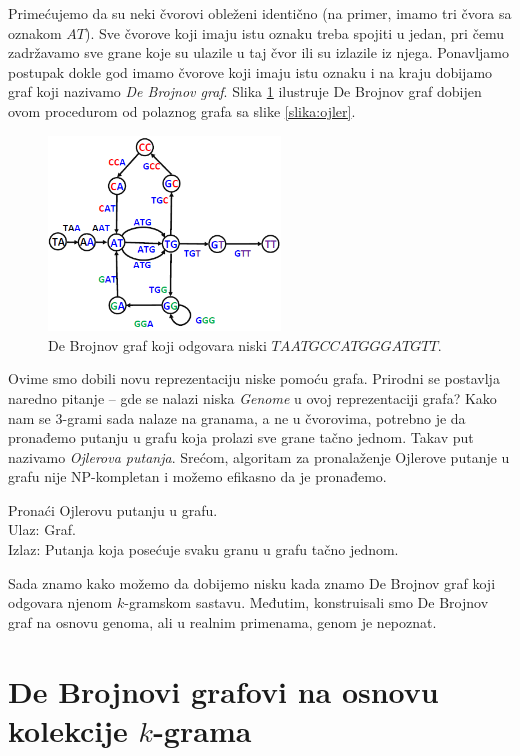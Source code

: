 Primećujemo da su neki čvorovi obleženi identično (na primer, imamo tri čvora sa oznakom $AT$). Sve čvorove koji imaju istu oznaku treba spojiti u jedan, pri čemu zadržavamo sve grane koje su ulazile u taj čvor ili su izlazile iz njega. Ponavljamo postupak dokle god imamo čvorove koji imaju istu oznaku i na kraju dobijamo graf koji nazivamo \emph{De Brojnov graf}. Slika \ref{slika:debrojnov} ilustruje De Brojnov graf dobijen ovom procedurom od polaznog grafa sa slike \ref{slika:ojler}. 

\begin{figure}[h]
	\centering
	\includegraphics[width=0.55\textwidth]{poglavlja/3/slike/debrojnov.png}
	\caption{De Brojnov graf koji odgovara niski $TAATGCCATGGGATGTT$.}
	\label{slika:debrojnov}
\end{figure} 

Ovime smo dobili novu reprezentaciju niske pomoću grafa. Prirodni se postavlja naredno pitanje -- gde se nalazi niska \textit{Genome} u ovoj reprezentaciji grafa? Kako nam se 3-grami sada nalaze na granama, a ne u čvorovima, potrebno je da pronađemo putanju u grafu koja prolazi sve grane tačno jednom. Takav put nazivamo \emph{Ojlerova putanja}. Srećom, algoritam za pronalaženje Ojlerove putanje u grafu nije NP-kompletan i možemo efikasno da je pronađemo.

\begin{problem}
	Pronaći Ojlerovu putanju u grafu. \\
	Ulaz: Graf. \\
	Izlaz: Putanja koja posećuje svaku granu u grafu tačno jednom.
\end{problem}

Sada znamo kako možemo da dobijemo nisku kada znamo De Brojnov graf koji odgovara njenom $k$-gramskom sastavu. Međutim, konstruisali smo De Brojnov graf na osnovu genoma, ali u realnim primenama, genom je nepoznat.

\section{De Brojnovi grafovi na osnovu kolekcije $k$-grama}

